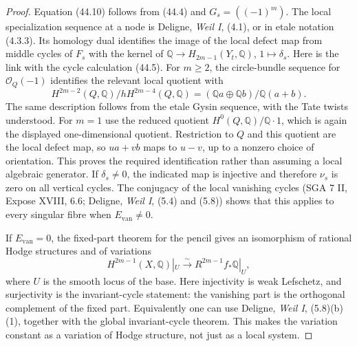 \begin{proof}
Equation (44.10) follows from (44.4) and $G_s=((-1)^m)$.
The local specialization sequence at a node is Deligne, \emph{Weil I},
(4.1), or in etale notation (4.3.3).  Its homology dual identifies
the image of the local defect map from middle cycles of $F_s$ with
the kernel of
$\mathbb Q\longrightarrow H_{2m-1}(Y_t,\mathbb Q)$,
$1\mapsto\delta_s$.  Here is the link with the cycle calculation
(44.5).  For $m\ge2$, the circle-bundle sequence for
$\mathcal O_Q(-1)$ identifies the relevant local quotient with
\[
 H^{2m-2}(Q,\mathbb Q)\big/
       hH^{2m-4}(Q,\mathbb Q)
   = (\mathbb Q a\oplus\mathbb Q b)/\mathbb Q(a+b).
\]
The same description follows from the etale Gysin sequence, with
the Tate twists understood.  For $m=1$ use the reduced quotient
$H^0(Q,\mathbb Q)/\mathbb Q\cdot1$, which is again the displayed
one-dimensional quotient.  Restriction to $Q$ and this quotient
are the local defect map, so $ua+vb$ maps to $u-v$, up to a
nonzero choice of orientation.  This proves the required
identification rather than assuming a local algebraic generator.
If
$\delta_s\ne0$, the indicated map is injective and therefore
$\nu_s$ is zero on all vertical cycles.  The conjugacy of the local
vanishing cycles (SGA 7 II, Expose XVIII, 6.6; Deligne, \emph{Weil I},
(5.4) and (5.8)) shows that this applies to every singular fibre
when $E_{\mathrm{van}}\ne0$.

If $E_{\mathrm{van}}=0$, the fixed-part theorem for the pencil gives
an isomorphism of rational Hodge structures and of variations
\[
 H^{2m-1}(X,\mathbb Q)|_U\xrightarrow{\sim}
 R^{2m-1}f_*\mathbb Q|_U,
\]
where $U$ is the smooth locus of the base.  Here injectivity is weak
Lefschetz, and surjectivity is the invariant-cycle statement:
the vanishing part is the orthogonal complement of the fixed part.
Equivalently one can use Deligne, \emph{Weil I}, (5.8)(b)(1), together
with the global invariant-cycle theorem.  This makes the variation
constant as a variation of Hodge structure, not just as a local
system.


\end{proof}
